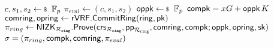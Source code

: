 \begin{algorithm}
	\eprint{}{\scriptsize}
	\caption{$\Gen_{sign}(\ring,\sk=(x,r),\pk,\aux,\msg)$}
	\label{alg:gensign}	 	
	\begin{algorithmic}[1]
			\State $ c,s_1, s_2 \leftsample \F_p $
			\State $ \pi_{eval}  \leftarrow (c,s_1, s_2)$
			\State $ \openpk \leftsample \F_p $
			\State $ \mathsf{compk} =  x G + \mathsf{oppk} \, K$
			\State $ \mathsf{comring}, \mathsf{opring} \leftarrow {\ensuremath{\mathsf{rVRF}}}.{\mathsf{CommitRing}}(\mathsf{ring}, \mathsf{pk}) $ \label{line:comring}
			\State $ \pi_{ring} \leftarrow {\ensuremath{\mathsf{NIZK}}}_{\mathcal{R}_{\mathtt{ring}}}.{\mathsf{Prove}}(\mathsf{crs}_{\mathcal{R}_{\mathtt{ring}}}, \mathsf{pp}_{\mathcal{R}_{\mathtt{ring}}}, \mathsf{comring}, \mathsf{compk}; \mathsf{oppk}, \mathsf{opring}, \mathsf{sk}) $ \label{line:piring}
			\State\Return$ \sigma = (\pi_{ring},\mathsf{compk},\mathsf{comring},\pi_{eval}) $
		\end{algorithmic}
	
\end{algorithm}
%
%
